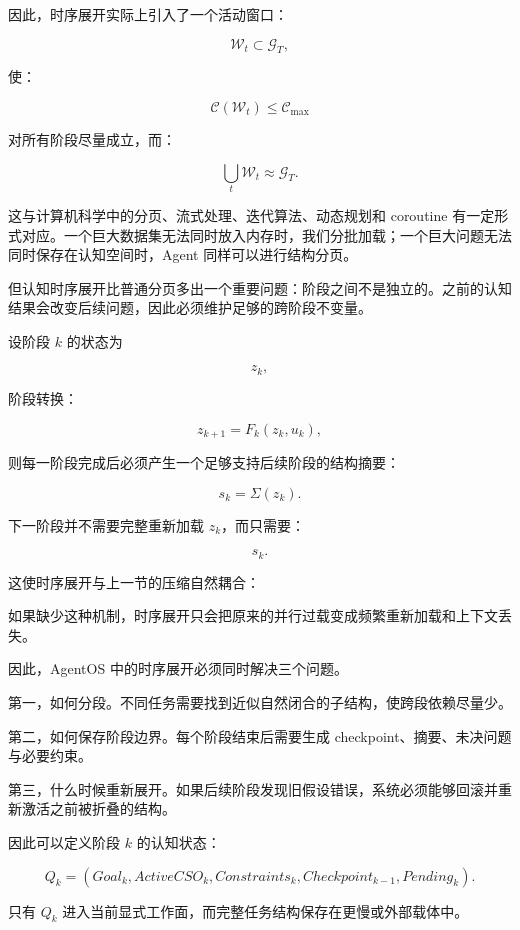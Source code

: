 因此，时序展开实际上引入了一个活动窗口：

\[
\mathcal W_t
\subset
\mathcal G_T,
\]

使：

\[
\mathcal C(\mathcal W_t)
\leq
\mathcal C_{\max}
\]

对所有阶段尽量成立，而：

\[
\bigcup_t
\mathcal W_t
\approx
\mathcal G_T.
\]

这与计算机科学中的分页、流式处理、迭代算法、动态规划和 coroutine 有一定形式对应。一个巨大数据集无法同时放入内存时，我们分批加载；一个巨大问题无法同时保存在认知空间时，Agent 同样可以进行结构分页。

但认知时序展开比普通分页多出一个重要问题：阶段之间不是独立的。之前的认知结果会改变后续问题，因此必须维护足够的跨阶段不变量。

设阶段 $k$ 的状态为

\[
z_k,
\]

阶段转换：

\[
z_{k+1}
=
F_k(z_k,u_k),
\]

则每一阶段完成后必须产生一个足够支持后续阶段的结构摘要：

\[
s_k
=
\Sigma(z_k).
\]

下一阶段并不需要完整重新加载 $z_k$，而只需要：

\[
s_k.
\]

这使时序展开与上一节的压缩自然耦合：

\begin{statementbox}
\centering
{}
\end{statementbox}

如果缺少这种机制，时序展开只会把原来的并行过载变成频繁重新加载和上下文丢失。

因此，AgentOS 中的时序展开必须同时解决三个问题。

第一，如何分段。不同任务需要找到近似自然闭合的子结构，使跨段依赖尽量少。

第二，如何保存阶段边界。每个阶段结束后需要生成 checkpoint、摘要、未决问题与必要约束。

第三，什么时候重新展开。如果后续阶段发现旧假设错误，系统必须能够回滚并重新激活之前被折叠的结构。

因此可以定义阶段 $k$ 的认知状态：

\[
Q_k
=
(
Goal_k,
ActiveCSO_k,
Constraints_k,
Checkpoint_{k-1},
Pending_k
).
\]

只有 $Q_k$ 进入当前显式工作面，而完整任务结构保存在更慢或外部载体中。

